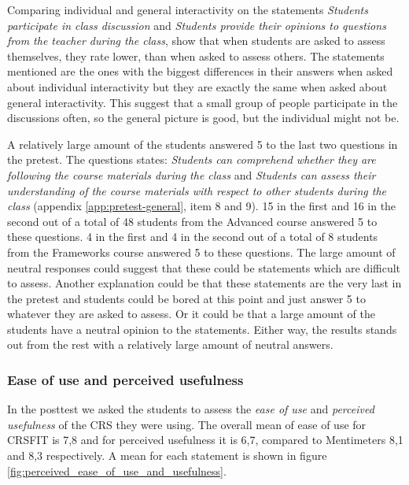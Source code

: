 Comparing individual and general interactivity on the statements \emph{Students participate in class discussion} and \emph{Students provide their opinions to questions from the teacher during the class}, show that when students are asked to assess themselves, they rate lower, than when asked to assess others. The statements mentioned are the ones with the biggest differences in their answers when asked about individual interactivity but they are exactly the same when asked about general interactivity. This suggest that a small group of people participate in the discussions often, so the general picture is good, but the individual might not be. 


A relatively large amount of the students answered 5 to the last two questions in the pretest. The questions states: \emph{Students can comprehend whether they are following the course materials during the class} and \emph{Students can assess their understanding of the course materials with respect to other students during the class} (appendix \ref{app:pretest-general}, item 8 and 9). 15 in the first and 16 in the second out of a total of 48 students from the Advanced course answered 5 to these questions. 4 in the first and 4 in the second out of a total of 8 students from the Frameworks course answered 5 to these questions. The large amount of neutral responses could suggest that these could be statements which are difficult to assess. Another explanation could be that these statements are the very last in the pretest and students could be bored at this point and just answer 5 to whatever they are asked to assess. Or it could be that a large amount of the students have a neutral opinion to the statements. Either way, the results stands out from the rest with a relatively large amount of neutral answers.


\subsubsection*{Ease of use and perceived usefulness}
In the posttest we asked the students to assess the \emph{ease of use} and \emph{perceived usefulness} of the CRS they were using. The overall mean of ease of use for CRSFIT is 7,8 and for perceived usefulness it is 6,7, compared to Mentimeters 8,1 and 8,3 respectively. A mean for each statement is shown in figure \ref{fig:perceived_ease_of_use_and_usefulness}.

